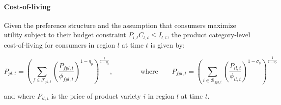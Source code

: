 \paragraph{Cost-of-living} Given the preference structure and the assumption that consumers maximize utility subject to their budget constraint $P_{l,t}C_{l,t} \leq I_{l,t}$, the product category-level cost-of-living for consumers in region $l$ at time $t$ is given by: 
\begin{linenomath*}
    \begin{equation*}
        P_{pl,t} = \left(\sum_{f\in\mathcal{F}_{pl,t}}
                        \left(\frac{P_{fpl,t}}{\phi_{fpl,t}}\right)^{1-\eta_p}\right)
                    ^{\frac{1}{1-\eta_p}}, \qquad \qquad \text{where} \qquad
        P_{fpl,t} = \left(\sum_{i\in\mathcal{B}_{fpl,t}}
                        \left(\frac{P_{il,t}}{\phi_{il,t}}\right)^{1-\sigma_p}\right)
                    ^{\frac{1}{1-\sigma_p}} 
    \end{equation*}
\end{linenomath*}
\noindent and where $P_{il,t}$ is the price of product variety $i$ in region $l$ at time $t$. 

